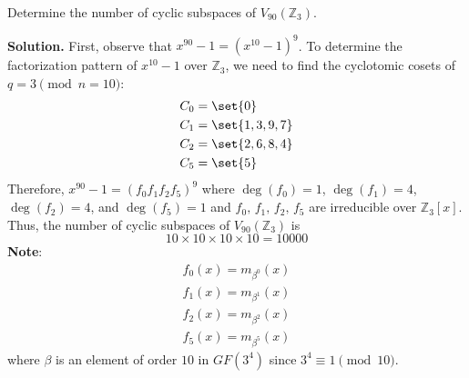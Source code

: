 \begin{Example}{}{}
    Determine the number of cyclic subspaces of $ V_{90}(\mathbb{Z}_3) $.

    \textbf{Solution.} First, observe that $ x^{90}-1=(x^{10}-1)^9 $.
    To determine the factorization pattern of $ x^{10}-1 $
    over $ \mathbb{Z}_3 $, we need to find the cyclotomic cosets
    of $ q=3\pmod{n=10} $:
    \begin{align*}
        C_0 & =\set{0}       \\
        C_1 & =\set{1,3,9,7} \\
        C_2 & =\set{2,6,8,4} \\
        C_5 & =\set{5}
    \end{align*}
    Therefore, $ x^{90}-1=(f_0f_1f_2f_5)^9 $ where
    $ \deg(f_0)=1 $, $ \deg(f_1)=4 $, $ \deg(f_2)=4 $, and $ \deg(f_5)=1 $
    and $ f_0,\,f_1,\,f_2,\,f_5 $ are irreducible over $ \mathbb{Z}_3[x] $.
    Thus, the number of cyclic subspaces of $ V_{90}(\mathbb{Z}_3) $
    is
    \[ 10\times 10\times 10\times 10=10 000 \]
    \textbf{Note}:
    \begin{align*}
        f_0(x)=m_{\beta^0}(x) \\
        f_1(x)=m_{\beta^1}(x) \\
        f_2(x)=m_{\beta^2}(x) \\
        f_5(x)=m_{\beta^5}(x)
    \end{align*}
    where $ \beta $ is an element of order $ 10 $ in $ GF(3^4) $
    since $ 3^4\equiv 1\pmod{10} $.
\end{Example}

